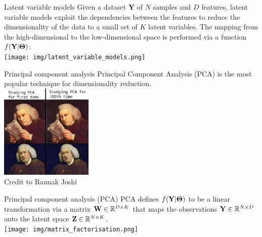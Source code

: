 \documentclass[aspectratio=169,notes]{beamer}
\begin{document}

	\begin{frame}{Latent variable models}
	Given a dataset $\mathbf{Y}$ of $N$ samples and $D$ features, latent variable models exploit the dependencies between the features to reduce the dimensionality of the data to a small set of $K$ latent variables. The mapping from the high-dimensional to the low-dimensional space is performed via a function $f({\bf Y}|\mbox{\boldmath $\Theta$})$:\\
	\centering
	\texttt{[image: img/latent\_variable\_models.png]}
	\end{frame}

	\begin{frame}{Principal component analysis}
	Principal Component Analysis (PCA) is the most popular technique for dimensionality reduction.\\
	\centering
	\includegraphics[height=4.5cm]{img/pca.jpeg}\\
  	\tiny Credit to Raunak Joshi \par
	\end{frame}


	\begin{frame}{Principal component analysis (PCA)}
	PCA defines $f({\bf Y}|\mbox{\boldmath $\Theta$})$ to be a linear transformation via a matrix ${\bf W} \in \mathbb{R}^{D \times K}$ that maps the observations ${\bf Y} \in \mathbb{R}^{N \times D}$ onto the latent space ${\bf Z} \in \mathbb{R}^{N \times K}$.\\
	\leavevmode\newline
	\centering
	\texttt{[image: img/matrix\_factorisation.png]}
	\end{frame}
\end{document}
